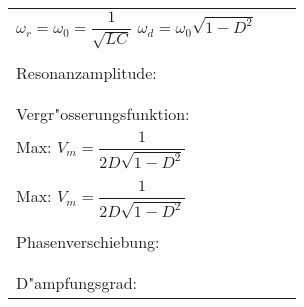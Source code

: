 \begin{tabular}{|p{4cm}|p{7cm}|p{7cm}|}
\begin{minipage}[]{7cm}
\vspace{0.1cm}
$\omega_r=\omega_0=\dfrac{1}{\sqrt{LC}}$ \qquad
$\omega_d=\omega_0\sqrt{1-D^2}
$ \end{minipage}
&
\begin{minipage}[]{7cm}
\vspace{0.2cm}
$\omega_r=\omega_0=\dfrac{1}{\sqrt{LC}}$\\
\end{minipage}\\
\hline
Resonanzamplitude: &
\begin{minipage}[]{7cm}
\vspace{0.1cm}
$I_{0_r}=\dfrac{U_0}{R_S}$\\
\end{minipage}&
\begin{minipage}[]{7cm}
\vspace{0.2cm}
$U_{0_r}=I_0\cdot R_P\qquad$ mit $ R_P =\dfrac{\omega^2\,L^2}{R_S}$\\
\end{minipage}\\
\hline
Vergr"osserungsfunktion: &
\begin{minipage}[]{7cm}
\vspace{0.1cm}
$V(\eta)=\dfrac{\eta^2}{\sqrt{(1-\eta^2)^2+(2D\,\eta)^2}}$\\ Max:
$V_m=\dfrac{1}{2D\sqrt{1-D^2}}$\\
\end{minipage} &
\begin{minipage}[]{7cm}
\vspace{0.2cm}
$V(\eta)=\dfrac{1}{\sqrt{(1-\eta^2)^2+(2D\,\eta)^2}}$\\
Max: $V_m=\dfrac{1}{2D\sqrt{1-D^2}}$\\
\end{minipage}\\
\hline
Phasenverschiebung: &
\begin{minipage}[]{7cm}
\vspace{0.1cm}
$\varphi_{_U}=\arctan\left(\dfrac{2D\,\eta}{1-\eta^2}\right)-\pi$\\
\end{minipage} &
\begin{minipage}[]{7cm}
\vspace{0.2cm}
$\varphi_{_I}=\arctan\left(\dfrac{2D\,\eta}{1-\eta^2}\right)$\\
\end{minipage}\\
\hline
D"ampfungsgrad: &
\begin{minipage}[]{7cm}

\end{minipage}
\end{tabular}
